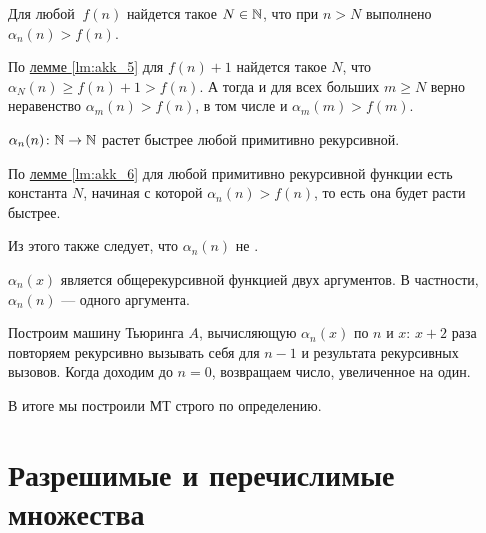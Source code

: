 \begin{lm}\label{lm:akk_6}
	Для любой \prf $ ~f(n)$ найдется такое  $ N \in \mathbb{N}$, что при $ n > N$ выполнено  $  \alpha _n(n) > f(n)$.
\end{lm}
\begin{proof*}
	По \hyperref[lm:akk_5]{лемме \ref{lm:akk_5}} для $ f(n) + 1$ найдется такое $ N$, что $  \alpha _N(n) \ge  f(n) + 1 > f(n)$. А тогда и для всех больших $ m \ge N$ верно неравенство $  \alpha _m(n) > f(n)$, в том числе и $\alpha _m(m) > f(m)$.
\end{proof*}
\begin{thm}
	$ \alpha _{n}(n) \colon \mathbb{N} \to \mathbb{N}$  растет быстрее любой примитивно рекурсивной.
\end{thm}
\begin{proof*}
	По \hyperref[lm:akk_5]{лемме \ref{lm:akk_6}} для любой примитивно рекурсивной функции есть константа $ N$, начиная с которой  $  \alpha _n(n) > f(n)$, то есть она будет расти быстрее.

	Из этого также следует, что $  \alpha _n(n)$ не \prf.
\end{proof*}
\begin{lm}\label{lm:akk_7}
	$ \alpha _n(x)$ является общерекурсивной функцией двух аргументов. В частности, $  \alpha _n(n)$ --- одного аргумента.
\end{lm}
\begin{proof*}
	Построим машину Тьюринга $ A$, вычисляющую $ \alpha _n(x)$ по $ n$ и  $ x$: $ x+2$ раза повторяем рекурсивно вызывать себя для $ n-1$ и результата рекурсивных вызовов. Когда доходим до $ n  = 0$, возвращаем число, увеличенное на один. 

	В итоге мы построили МТ строго по определению.
\end{proof*}


\chapter{Разрешимые и перечислимые множества}
